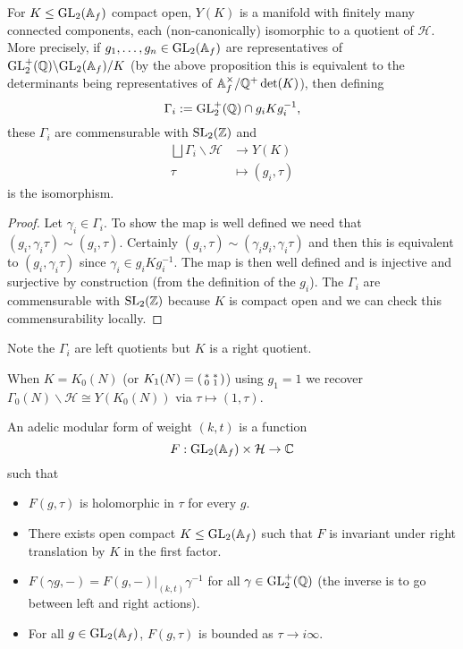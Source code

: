 \begin{thm}\label{adelic curve}
    For $K \leq \mathrm{GL}_2(\mathbb{A}_f)$ compact open, $Y(K)$ is a manifold with finitely many connected components, each (non-canonically) isomorphic to a quotient of $\mathcal H$. More precisely, if $g_1,\dots,g_n \in \mathrm{GL}_2(\mathbb{A}_f)$ are representatives of $\mathrm{GL}_2^+(\mathbb{Q})\backslash\mathrm{GL}_2(\mathbb{A}_f)/K$ (by the above proposition this is equivalent to the determinants being representatives of $\mathbb{A}_f^\times/\mathbb{Q}^+\det(K)$), then defining $$\Gamma_i := \mathrm{GL}_2^+(\mathbb{Q}) \cap g_i K g_i^{-1},$$ these $\Gamma_i$ are commensurable with $\mathrm{SL}_2(\mathbb{Z})$ and 
    \begin{equation*}
        \begin{split}
        \bigsqcup \Gamma_i \backslash \mathcal H &\to Y(K) \\
        \tau &\mapsto (g_i,\tau)
        \end{split}
    \end{equation*}
    is the isomorphism.
\end{thm}
\begin{proof}
    Let $\gamma_i \in \Gamma_i$. To show the map is well defined we need that $(g_i,\gamma_i\tau) \sim (g_i,\tau)$. Certainly $(g_i,\tau) \sim (\gamma_ig_i,\gamma_i\tau)$ and then this is equivalent to $(g_i,\gamma_i\tau)$ since $\gamma_i \in g_iKg_i^{-1}$. The map is then well defined and is injective and surjective by construction (from the definition of the $g_i$). The $\Gamma_i$ are commensurable with $\mathrm{SL}_2(\mathbb{Z})$ because $K$ is compact open and we can check this commensurability locally. 
\end{proof}
Note the $\Gamma_i$ are left quotients but $K$ is a right quotient.
\begin{example}
    When $K=K_0(N)$ (or $K_1(N)=\begin{psmallmatrix}
        *&*\\0&1
    \end{psmallmatrix}$) using $g_1=1$ we recover $\Gamma_0(N)\backslash \mathcal H \cong Y(K_0(N))$ via $\tau \mapsto (1,\tau)$.
\end{example}
\begin{defn}
    An adelic modular form of weight $(k,t)$ is a function 
    $$F: \mathrm{GL}_2(\mathbb{A}_f) \times \mathcal H \to \mathbb{C}$$ such that
    \begin{itemize}
        \item $F(g,\tau)$ is holomorphic in $\tau$ for every $g$.
        \item There exists open compact $K \leq \mathrm{GL}_2(\mathbb{A}_f)$ such that $F$ is invariant under right translation by $K$ in the first factor.
        \item $F(\gamma g, -) = F(g, -)|_{(k,t)} \gamma^{-1}$ for all $\gamma \in \mathrm{GL}_2^+(\mathbb{Q})$ (the inverse is to go between left and right actions).
        \item For all $g \in \mathrm{GL}_2(\mathbb{A}_f)$, $F(g,\tau)$ is bounded as $\tau \to i\infty$.
    \end{itemize}
\end{defn}
